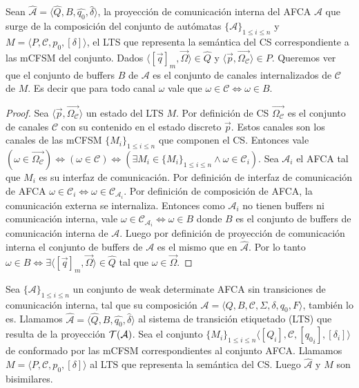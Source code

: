 \begin{lemma}\label{lemma2} Sean $\widehat{\mathcal{A}}=\langle \widehat{Q}, B, \widehat{q_0}, \widehat{\delta} \rangle$, la proyección de comunicación interna del AFCA $\mathcal{A}$ que surge de la composición del conjunto de autómatas  $\{\mathcal{A}\}_{1 \leq i \leq n}$  y $M= \langle P, \mathcal{C}, p_0, [\delta] \rangle$, el LTS que representa la semántica del CS correspondiente a las mCFSM del conjunto. Dados $\langle [\overrightarrow{q}]_m, \overrightarrow{\Omega} \rangle \in \widehat{Q}$ y $\langle \overrightarrow{p}, \overrightarrow{\Omega_{\mathcal{C}}} \rangle \in P$. Queremos ver que el conjunto de buffers $B$ de $\mathcal{A}$ es el conjunto de canales internalizados de $\mathcal{C}$ de $M$. Es decir que para todo canal $\omega$ vale que $\omega \in \mathcal{C} \iff \omega \in B$.
\end{lemma}
\begin{proof} Sea $\langle \overrightarrow{p}, \overrightarrow{\Omega_{\mathcal{C}}} \rangle$ un estado del LTS $M$. Por definición de CS $\overrightarrow{\Omega_{\mathcal{C}}}$ es el conjunto de canales $\mathcal{C}$ con su contenido en el estado discreto $\overrightarrow{p}$. Estos canales son los canales de las mCFSM $\{M_i\}_{1 \leq i \leq n}$ que componen el CS. Entonces vale $(\omega \in \overrightarrow{\Omega_{\mathcal{C}}}) \iff (\omega \in \mathcal{C}) \iff (\exists M_i \in \{M_i\}_{1 \leq i \leq n} \land  \omega \in \mathcal{C}_i)$. Sea $\mathcal{A}_i$ el AFCA tal que $M_i$ es su interfaz de comunicación. Por definición de interfaz de comunicación de AFCA $\omega \in \mathcal{C}_i \iff \omega \in {\mathcal{C}}_{\mathcal{A}_i}$. Por definición de composición de AFCA, la comunicación externa se internaliza. Entonces como $\mathcal{A}_i$ no tienen buffers ni comunicación interna, vale $\omega \in {\mathcal{C}}_{\mathcal{A}_i} \iff \omega \in B$ donde $B$ es el conjunto de buffers de comunicación interna de $\mathcal{A}$. Luego por definición de proyección de comunicación interna el conjunto de buffers de $\mathcal{A}$ es el mismo que en $\widehat{\mathcal{A}}$. Por lo tanto $\omega \in B \iff \exists \langle [\overrightarrow{q}]_m, \overrightarrow{\Omega} \rangle \in \widehat{Q}$ tal que $\omega \in \overrightarrow{\Omega}$.
\end{proof}


\begin{theorem} Sea $\{\mathcal{A}\}_{1 \leq i \leq n}$ un conjunto de weak determinate AFCA sin transiciones de comunicación interna, tal que su composición $\mathcal{A} = \langle Q, B, \mathcal{C},\Sigma, \delta, q_0, F \rangle$, también lo es. Llamamos $\widehat{\mathcal{A}}=\langle \widehat{Q}, B, \widehat{q_0}, \widehat{\delta} \rangle$ al sistema de transición etiquetado (LTS) que resulta de la proyección $\mathcal{T}(\mathcal{A})$. Sea el conjunto $\{M_i\}_{1 \leq i \leq n} \langle [Q_i], \mathcal{C}, [{q_0}_i], [\delta_i] \rangle$ de conformado por las mCFSM correspondientes al conjunto AFCA. Llamamos $M = \langle P, \mathcal{C}, {p_0}, [\delta] \rangle$ al LTS que representa la semántica del CS. Luego $\widehat{\mathcal{A}}$ y $M$ son bisimilares. 
\end{theorem}

